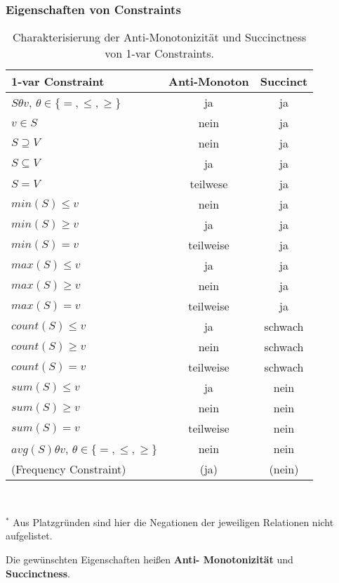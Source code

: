 \subsubsection{Eigenschaften von Constraints}
\begin{table}[!ht]
  \centering
  \caption{Charakterisierung der Anti-Monotonizität und Succinctness von
	1-var Constraints.}
  \label{tab:var_con}
\begin{tabular}{lcc}
	\toprule
	1-var Constraint & Anti-Monoton & Succinct\\
	\midrule
	\(S\theta v\), \(\theta\in\{=,\leq,\geq\}\) & ja & ja\\
	\(v\in S\) & nein & ja\\
	\(S\supseteq V\) & nein & ja\\
	\(S\subseteq V\) & ja & ja\\
	\(S = V\) & teilwese & ja\\
	\midrule
	\(min(S)\leq v\) & nein & ja\\
	\(min(S)\geq v\) & ja & ja\\
	\(min(S) = v\) & teilweise & ja\\
	\midrule
	\(max(S)\leq v\) & ja & ja\\
	\(max(S)\geq v\) & nein & ja\\
	\(max(S) = v\) & teilweise & ja\\
	\midrule
	\(count(S)\leq v\) & ja & schwach\\
	\(count(S)\geq v\) & nein & schwach\\
	\(count(S) = v\) & teilweise & schwach\\
	\midrule
	\(sum(S)\leq v\) & ja & nein\\
	\(sum(S)\geq v\) & nein & nein\\
	\(sum(S) = v\) & teilweise & nein\\
	\midrule
	\(avg(S)\theta v\), \(\theta\in\{=, \leq, \geq\}\) & nein & nein\\
	\midrule
	(Frequency Constraint) & (ja) & (nein)\\
	\bottomrule
\end{tabular}
	\\
	\vspace{10pt}
	{\raggedright \(^*\) Aus Platzgründen sind hier die Negationen der 
	jeweiligen Relationen nicht aufgelistet.\\}
\end{table}

Die gewünschten Eigenschaften heißen \textbf{Anti-
Monotonizität} und \textbf{Succinctness}.

